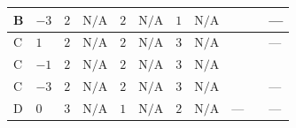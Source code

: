 \documentclass[8pt]{article}
\begin{document}
\begin{landscape}
\begin{longtable}{@{}llcccccc >{\raggedright\arraybackslash}p{0.21\linewidth} >{\raggedright\arraybackslash}p{0.21\linewidth} >{\raggedright\arraybackslash}p{0.21\linewidth}@{}}
\midrule
B & $-3$ & $2$ & $\text{N/A}$ & $2$ & $\text{N/A}$ & $1$ & $\text{N/A}$ & \scriptsize\adjustbox{max width=\linewidth}{$\begin{gathered} -\frac{3 {g_1}^2 {m_2^2}}{2}\end{gathered}$} & \scriptsize\adjustbox{max width=\linewidth}{$\begin{gathered} +6 {\lambda_{S_2}^{(1)}} {m_2^2}\end{gathered}$} & --- \\
\midrule
C & $1$ & $2$ & $\text{N/A}$ & $2$ & $\text{N/A}$ & $3$ & $\text{N/A}$ & \scriptsize\adjustbox{max width=\linewidth}{$\begin{gathered} -\frac{27 {g_1}^2 {m_2^2}}{2}\end{gathered}$} & \scriptsize\adjustbox{max width=\linewidth}{$\begin{gathered} +6 {\lambda_{S_2}^{(1)}} {m_2^2}\end{gathered}$} & --- \\
\midrule
C & $-1$ & $2$ & $\text{N/A}$ & $2$ & $\text{N/A}$ & $3$ & $\text{N/A}$ & \scriptsize\adjustbox{max width=\linewidth}{$\begin{gathered} -\frac{3 {g_1}^2 {m_2^2}}{2}\end{gathered}$} & \scriptsize\adjustbox{max width=\linewidth}{$\begin{gathered} +6 {\lambda_{S_2}^{(1)}} {m_2^2}\end{gathered}$} & \scriptsize\adjustbox{max width=\linewidth}{$\begin{gathered} 6 {\mu_{\mathrm{T3GeneralS1S2}}} \left({\lambda_{10}}\right)^{*}\end{gathered}$} \\
\midrule
C & $-3$ & $2$ & $\text{N/A}$ & $2$ & $\text{N/A}$ & $3$ & $\text{N/A}$ & \scriptsize\adjustbox{max width=\linewidth}{$\begin{gathered} -\frac{3 {g_1}^2 {m_2^2}}{2}\end{gathered}$} & \scriptsize\adjustbox{max width=\linewidth}{$\begin{gathered} +6 {\lambda_{S_2}^{(1)}} {m_2^2}\end{gathered}$} & --- \\
\midrule
D & $0$ & $3$ & $\text{N/A}$ & $1$ & $\text{N/A}$ & $2$ & $\text{N/A}$ & --- & \scriptsize\adjustbox{max width=\linewidth}{$\begin{gathered} +4 {\lambda_{S_2}^{(1)}} {m_2^2}\end{gathered}$} & --- \\
\midrule

\end{longtable}
\end{landscape}
\end{document}
